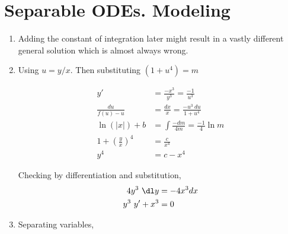 \section{Separable ODEs. Modeling}

\begin{enumerate}
    \item Adding the constant of integration later might result in a vastly different general solution which is almost always wrong.

    \item Using $u = y/x$. Then substituting $(1 + u^{4}) = m$

          \begin{align}
              y'                               & = \frac{-x^{3}}{y^{3}} = \frac{-1}{u^{3}}      \\
              \frac{du}{f(u) - u}              & =  \frac{dx}{x} = \frac{-u^{3}\ du}{1 + u^{4}} \\
              \ln (|x|) + b                    & = \int \frac{-dm}{4m} = \frac{-1}{4} \ln m     \\
              1 + \left(\frac{y}{x}\right)^{4} & = \frac{c}{x^{4}}                              \\
              y^{4}                            & = c - x^{4}
          \end{align}
          \begin{figure}[H]
              \centering
          \end{figure}
          Checking by differentiation and substitution,
          \begin{align}
              4y^{3}\ \dl y     & = -4x^{3} dx \\
              y^{3}\ y' + x^{3} & = 0
          \end{align}


    \item Separating variables,


\end{enumerate}
